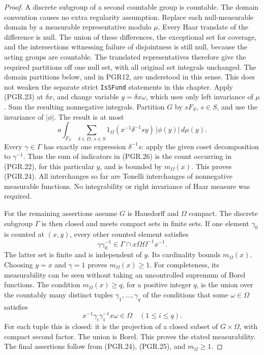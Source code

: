 \documentclass[11pt,a4paper]{article}
\numberwithin{equation}{section}
\theoremstyle{remark}\newtheorem{remark}[theorem]{Remark}
\begin{document}
\begin{proof}
A discrete subgroup of a second countable group is countable.
The domain convention causes no extra regularity assumption.
Replace each null-measurable domain by a measurable representative
modulo \(\mu\).  Every Haar translate of the difference is null.
The union of these differences, the exceptional set for coverage,
and the intersections witnessing failure of disjointness is still
null, because the acting groups are countable.  The translated
representatives therefore give the required partitions off one null
set, with all original set integrals unchanged.  The domain partitions
below, and in PGR12, are understood in this sense.  This does not
weaken the separate strict \texttt{Is\allowbreak SFund} statements in this chapter.
Apply (PGR.23) at \(\delta x\), and change variable
\(y=\delta x\omega\), which uses only left invariance of
\(\mu\).  Sum the resulting nonnegative integrals.  Partition
\(G\) by \(sF_S\), \(s\in S\), and use the invariance
of \(|\phi|\).  The result is at most
\[
 a\int_{F_S}\sum_{\delta\in D,\ s\in S}
    1_\Omega(x^{-1}\delta^{-1}s y)\,|\phi(y)|\,d\mu(y).
\tag{PGR.26}
\]
Every \(\gamma\in\Gamma\) has exactly one expression
\(\delta^{-1}s\): apply the given coset decomposition to
\(\gamma^{-1}\).  Thus the sum of indicators in (PGR.26)
is the count occurring in (PGR.22), for this particular \(y\),
and is bounded by \(m_\Omega(x)\).  This proves (PGR.24).
All interchanges so far are Tonelli interchanges of nonnegative
measurable functions.  No integrability or right invariance of Haar
measure was required.

For the remaining assertions assume \(G\) is Hausdorff and
\(\Omega\) compact.  The discrete subgroup \(\Gamma\) is
then closed and meets compact sets in finite sets.
If one element \(\gamma_0\) is
counted at \((x,y)\), every other counted element satisfies
\[
 \gamma\gamma_0^{-1}\in
                     \Gamma\cap x\Omega\Omega^{-1}x^{-1}.
\]
The latter set is finite and is independent of \(y\).  Its
cardinality bounds \(m_\Omega(x)\).  Choosing \(y=x\)
and \(\gamma=1\) proves \(m_\Omega(x)\geq1\).
For completeness, its measurability can be seen without taking an
uncontrolled supremum of Borel functions.  The condition
\(m_\Omega(x)\geq q\), for a positive integer \(q\), is the
union over the countably many distinct tuples
\(\gamma_1,\ldots,\gamma_q\) of the conditions that some
\(\omega\in\Omega\) satisfies
\[
       x^{-1}\gamma_i\gamma_1^{-1}x\omega\in\Omega
                                  \quad(1\leq i\leq q).
\]
For each tuple this is closed: it is the projection of a closed subset
of \(G\times\Omega\), with compact second factor.  The union
is Borel.  This proves the stated measurability.  The final assertions
follow from (PGR.24), (PGR.25), and \(m_\Omega\geq1\).
\end{proof}
\end{document}
